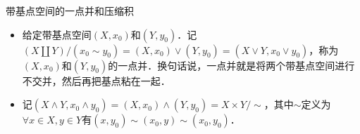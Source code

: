 \begin{definition}{带基点空间的一点并和压缩积}\label{Topo9_def1}
\begin{itemize}
\item 给定带基点空间$(X, x_0)$和$(Y, y_0)$．记$(X\amalg Y)/(x_0\sim y_0)=(X, x_0)\vee(Y, y_0)=(X\vee Y, x_0\vee y_0)$，称为$(X, x_0)$和$(Y, y_0)$的一点并．换句话说，一点并就是将两个带基点空间进行不交并，然后再把基点粘在一起．

\item 记$(X\land Y, x_0\land y_0)=(X, x_0)\land(Y, y_0)=X\times Y/\sim$，其中$\sim$定义为$\forall x\in X, y\in Y$有$ (x, y_0)\sim(x_0, y)\sim(x_0, y_0)$．

\end{itemize}
\end{definition}
